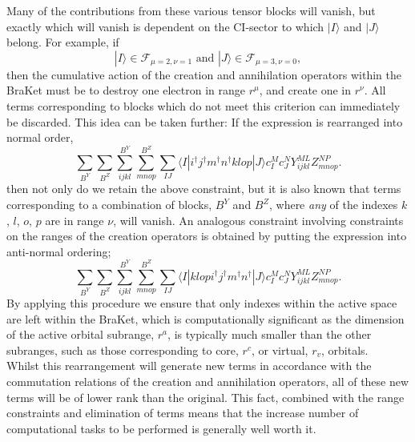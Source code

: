 \documentclass[12pt]{article}
\begin{document}
\noindent Many of the contributions from these various tensor blocks will
vanish, but exactly which will vanish is dependent on the CI-sector to which
$|I \rangle$ and $|J \rangle$ belong. For example, if 
\begin{equation*}
|I\rangle \in \mathcal{F}_{\mu = 2,\nu = 1} \text{ \ \ \ \ and  \ \ \ \ } |J\rangle \in \mathcal{F}_{\mu = 3,\nu = 0},
\end{equation*}
then the cumulative action of the creation and annihilation operators within
the BraKet must be to destroy one electron in range $r^{\mu}$, and create one
in $r^{\nu}$. All terms corresponding to blocks which do not meet this
criterion can immediately be discarded. This idea can be taken further: If the
expression is rearranged into normal order,
\begin{equation}
\sum_{B^{Y}}\sum_{B^{Z}}
\sum^{B^{Y}}_{ijkl}\sum^{B^{Z}}_{mnop} \sum_{IJ} \langle I | i^{\dagger}j^{\dagger}m^{\dagger}n^{\dagger}klop | J \rangle c^{M}_{I} c_{J}^{N} Y^{ML}_{ijkl}Z^{NP}_{mnop}.
\label{eqn:basic_term_nordered}
\end{equation}
\noindent then not only do we retain the above constraint, but it is also known
that terms corresponding to a combination of blocks, $B^{Y}$ and $B^{Z}$, where
\emph{any} of the indexes $k$, $l$, $o$, $p$ are in range $\nu$, will vanish.
An analogous constraint involving constraints on the ranges of the creation 
operators is obtained by putting the expression into anti-normal ordering;
\begin{equation}
\sum_{B^{Y}}\sum_{B^{Z}}
\sum^{B^{Y}}_{ijkl}\sum^{B^{Z}}_{mnop} \sum_{IJ} \langle I |klop i^{\dagger}j^{\dagger}m^{\dagger}n^{\dagger} | J \rangle c^{M}_{I} c_{J}^{N} Y^{ML}_{ijkl}Z^{NP}_{mnop}.
\label{eqn:basic_term_anordered}
\end{equation}
\noindent By applying this procedure we ensure that only indexes within the
active space are left within the BraKet, which is computationally significant
as the dimension of the active orbital subrange, $r^{a}$, is typically much
smaller than the other subranges, such as those corresponding to core, $r^{c}$, or virtual, $r_{v}$, orbitals.\\

\noindent Whilst this rearrangement will generate new terms in accordance with
the commutation relations of the creation and annihilation operators, all of
these new terms will be of lower rank than the original.  This fact, combined
with the range constraints and elimination of terms means that the increase
number of computational tasks to be performed is generally well worth it.\\  
\end{document}
